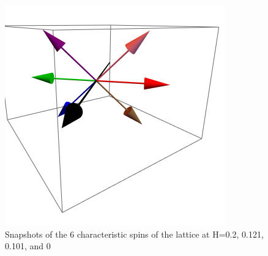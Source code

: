 \documentclass{article}
\begin{document}
\begin{figure}[ht]
\includegraphics[scale=0.3]{HVariedData/Pictures/110Dec201.png}
\caption{Snapshots of the 6 characteristic spins of the lattice at H=0.2, 0.121, 0.101, and 0 }
\end{figure}
\clearpage
\end{document}
